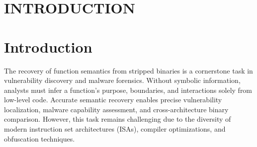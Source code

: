 \documentclass[acmsmall,screen,review,anonymous]{acmart} %
\begin{document}



\maketitle


\section{INTRODUCTION}

\section{Introduction}

The recovery of function semantics from stripped binaries is a cornerstone task in vulnerability discovery and malware forensics. Without symbolic information, analysts must infer a function's purpose, boundaries, and interactions solely from low-level code. Accurate semantic recovery enables precise vulnerability localization, malware capability assessment, and cross-architecture binary comparison. However, this task remains challenging due to the diversity of modern instruction set architectures (ISAs), compiler optimizations, and obfuscation techniques.
\end{document}

